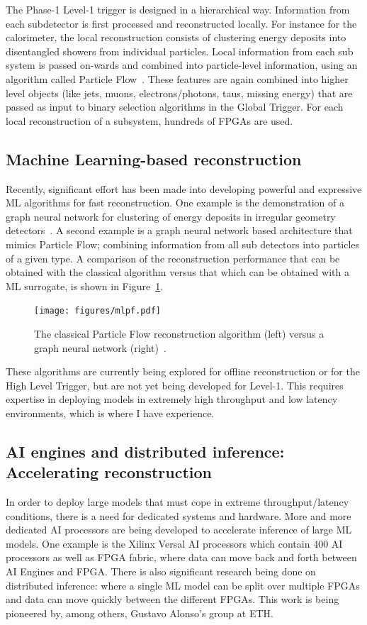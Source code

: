 \documentclass[12pt]{iopart}
\begin{document}
The Phase-1 Level-1 trigger is designed in a hierarchical way. Information from each subdetector is first processed and reconstructed locally. For instance for the calorimeter, the local reconstruction consists of clustering energy deposits into disentangled showers from individual particles. Local information from each sub system is passed on-wards and combined into particle-level information, using an algorithm called Particle Flow~\cite{Sirunyan_2017}. These features are again combined into higher level objects (like jets, muons, electrons/photons, taus, missing energy) that are passed as input to binary selection algorithms in the Global Trigger. For each local reconstruction of a subsystem, hundreds of FPGAs are used.

\subsection{Machine Learning-based reconstruction}
Recently, significant effort has been made into developing powerful and expressive ML algorithms for fast reconstruction. One example is the demonstration of a graph neural network for clustering of energy deposits in irregular geometry detectors~\cite{garnet}. A second example is a graph neural network based architecture that mimics Particle Flow; combining information from all sub detectors into particles of a given type. A comparison of the reconstruction performance that can be obtained with the classical algorithm versus that which can be obtained with a ML surrogate, is shown in Figure~\ref{fig:mlpf}.
\begin{figure}[ht]
    \centering
    \texttt{[image: figures/mlpf.pdf]}
    \caption{The classical Particle Flow reconstruction algorithm (left) versus a graph neural network (right)~\cite{mlpf}.}
    \label{fig:mlpf}
\end{figure}
These algorithms are currently being explored for offline reconstruction or for the High Level Trigger, but are not yet being developed for Level-1. This requires expertise in deploying models in extremely high throughput and low latency environments, which is where I have experience.

\subsection{AI engines and distributed inference: Accelerating reconstruction}
In order to deploy large models that must cope in extreme throughput/latency conditions, there is a need for dedicated systems and hardware. More and more dedicated AI processors are being developed to accelerate inference of large ML models. One example is the Xilinx Versal AI processors which contain 400 AI processors as well as FPGA fabric, where data can move back and forth between AI Engines and FPGA. There is also significant research being done on distributed inference: where a single ML model can be split over multiple FPGAs and data can move quickly between the different FPGAs. This work is being pioneered by, among others, Gustavo Alonso's group at ETH. 
\end{document}
